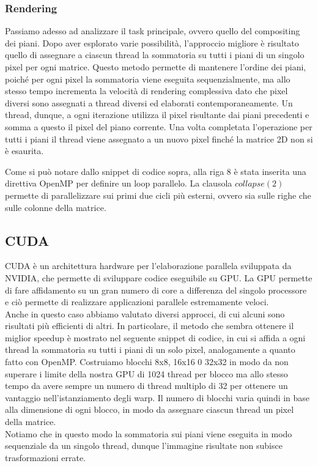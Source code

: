 \documentclass[11pt]{article}
\begin{document}
    \subsubsection{Rendering}
    Passiamo adesso ad analizzare il task principale, ovvero quello del compositing dei piani.
    Dopo aver esplorato varie possibilità, l'approccio migliore è risultato quello di assegnare a ciascun thread la
    sommatoria su tutti i piani di un singolo pixel per ogni matrice.
    Questo metodo permette di mantenere l'ordine dei piani, poiché per ogni pixel la sommatoria viene eseguita
    sequenzialmente, ma allo stesso tempo incrementa la velocità di rendering complessiva dato che pixel diversi sono
    assegnati a thread diversi ed elaborati contemporaneamente.
    Un thread, dunque, a ogni iterazione utilizza il pixel risultante dai piani precedenti e somma a questo il pixel
    del piano corrente.
    Una volta completata l'operazione per tutti i piani il thread viene assegnato a un nuovo pixel finché la matrice 2D non si è esaurita.
    
    Come si può notare dallo snippet di codice sopra, alla riga 8 è stata inserita una direttiva OpenMP per definire un loop parallelo.
    La clausola $collapse(2)$ permette di parallelizzare sui primi due cicli più esterni, ovvero sia sulle righe che sulle colonne della matrice.\\

    \subsection{CUDA}\label{subsec:cuda}
    CUDA è un architettura hardware per l'elaborazione parallela sviluppata da NVIDIA, che permette di sviluppare codice eseguibile su GPU.
    La GPU permette di fare affidamento su un gran numero di core a differenza del singolo processore e ciò permette di
    realizzare applicazioni parallele estremamente veloci.\\

    Anche in questo caso abbiamo valutato diversi approcci, di cui alcuni sono risultati più efficienti di altri.
    In particolare, il metodo che sembra ottenere il miglior speedup è mostrato nel seguente snippet di codice, in cui
    si affida a ogni thread la sommatoria su tutti i piani di un solo pixel, analogamente a quanto fatto con OpenMP.
    Costruiamo blocchi 8x8, 16x16 0 32x32 in modo da non superare i limite della nostra GPU di 1024 thread per blocco ma
    allo stesso tempo da avere sempre un numero di thread multiplo di 32 per ottenere un vantaggio nell'istanziamento degli warp.
    Il numero di blocchi varia quindi in base alla dimensione di ogni blocco, in modo da assegnare ciascun thread un pixel della matrice.\\
    
    
    Notiamo che in questo modo la sommatoria sui piani viene eseguita in modo sequenziale da un singolo thread,
    dunque l'immagine risultate non subisce trasformazioni errate.
\end{document}
